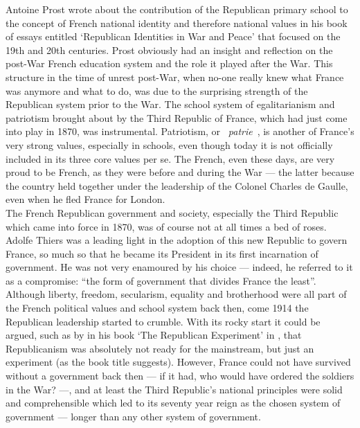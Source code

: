 \documentclass[12pt]{article}
\begin{document}
Antoine Prost wrote about the contribution of the Republican primary
school to the concept of French national identity and therefore
national values in his book of essays entitled `Republican Identities
in War and Peace' that focused on the 19th and 20th
centuries\cite{prost}.  Prost obviously had an insight and reflection
on the post-War French education system and the role it played after
the War. This structure in the time of unrest post-War, when no-one
really knew what France was anymore and what to do, was due to the
surprising strength of the Republican system prior to the War. The
school system of egalitarianism and patriotism brought about by the
Third Republic of France, which had just come into play in 1870, was
instrumental.  Patriotism, or
\guillemotleft~\textit{patrie}~\guillemotright, is another of France's
very strong values, especially in schools\cite{patriotism-schools},
even though today it is not officially included in its three core
values per se. The French, even these days, are very proud to be
French\cite{proud-french}, as they were before and during the
War\cite{proud-war-french} --- the latter because the country held
together under the leadership of the Colonel Charles de Gaulle, even
when he fled France for London.\\

The French Republican government and society, especially the Third
Republic which came into force in 1870, was of course not at all times
a bed of roses. Adolfe Thiers was a leading light in the adoption of
this new Republic to govern France, so much so that he became its
President in its first incarnation of government. He was not very
enamoured by his choice --- indeed, he referred to it as a compromise:
``the form of government that divides France the
least''\cite[p.~351]{world-civilisation}. Although liberty, freedom,
secularism, equality and brotherhood were all part of the French
political values and school system back then, come 1914 the Republican
leadership started to crumble. With its rocky start it could be
argued, such as by \citeauthor{republican-experiment} in his book `The
Republican Experiment' in \citeyear{republican-experiment}, that
Republicanism was absolutely not ready for the mainstream, but just an
experiment (as the book title suggests). However, France could not
have survived without a government back then --- if it had, who would
have ordered the soldiers in the War? ---, and at least the Third
Republic's national principles were solid and comprehensible which led
to its seventy year reign as the chosen system of government ---
longer than any other system of
government\cite[p.~15]{republic-seventy}.\\
\end{document}
